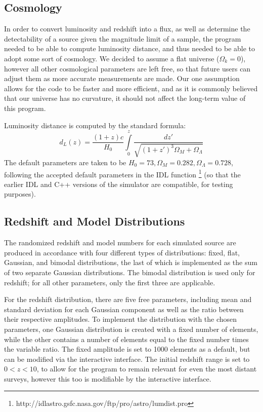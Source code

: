 \documentclass[twocolumn,letterpaper,10pt]{article}
\begin{document}
\subsection{Cosmology}

In order to convert luminosity and redshift into a flux, as well as determine the detectability of a source given the magnitude limit of a sample, the program needed to be able to compute luminosity distance, and thus needed to be able to adopt some sort of cosmology. We decided to assume a flat universe ($\Omega_k=0$), however all other cosmological parameters are left free, so that future users can adjust them as more accurate measurements are made. Our one assumption allows for the code to be faster and more efficient, and as it is commonly believed that our universe has no curvature, it should not affect the long-term value of this program.

Luminosity distance is computed by the standard formula:
$$
d_L(z)=\frac{(1+z)c}{H_0}\int\limits_0^z\frac{dz'}{\sqrt{(1+z')^3\Omega_M+\Omega_\Lambda}}
$$
The default parameters are taken to be $H_0=73,\Omega_M=0.282,\Omega_\Lambda=0.728$, following the accepted default parameters in the IDL function {}\footnote{http://idlastro.gsfc.nasa.gov/ftp/pro/astro/lumdist.pro} (so that the earlier IDL and C++ versions of the simulator are compatible, for testing purposes).

\subsection{Redshift and Model Distributions}

The randomized redshift and model numbers for each simulated source are produced in accordance with four different types of distributions: fixed, flat, Gaussian, and bimodal distributions, the last of which is implemented as the sum of two separate Gaussian distributions. The bimodal distribution is used only for redshift; for all other parameters, only the first three are applicable. 

For the redshift distribution, there are five free parameters, including mean and standard deviation for each Gaussian component as well as the ratio between their respective amplitudes. To implement the distribution with the chosen parameters, one Gaussian distribution is created with a fixed number of elements, while the other contains a number of elements equal to the fixed number times the variable ratio. The fixed amplitude is set to 1000 elements as a default, but can be modified via the interactive interface. The initial redshift range is set to $0<z<10$, to allow for the program to remain relevant for even the most distant surveys, however this too is modifiable by the interactive interface.
\end{document}
